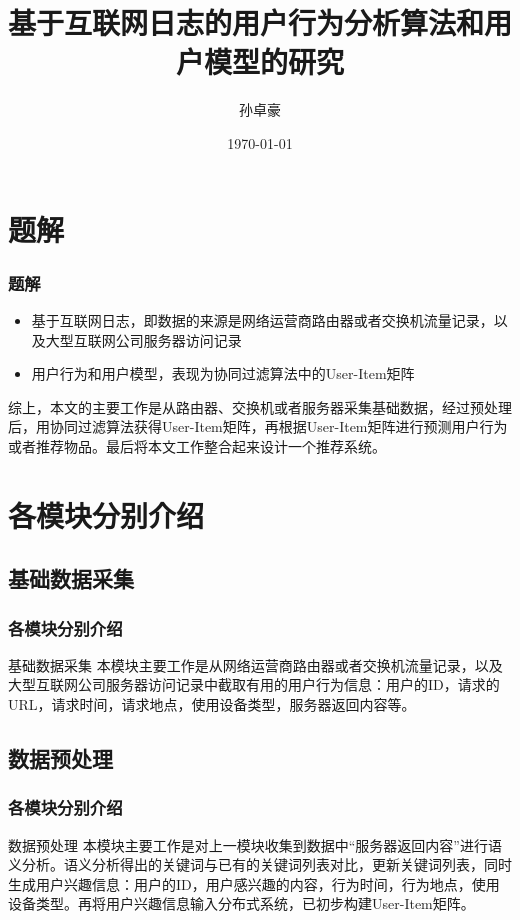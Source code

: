 \documentclass{beamer}
\title{基于互联网日志的用户行为分析算法和用户模型的研究}
\author{孙卓豪}
\institute{南开大学 \& 电子信息科学与技术}
\date{\today}
\begin{document}
\begin{frame}
	\titlepage
\end{frame}

\begin{frame}
	\tableofcontents
\end{frame}

\section{题解}
\begin{frame}
	\frametitle{题解}
	\begin{itemize}
		\item 基于互联网日志，即数据的来源是网络运营商路由器或者交换机流量记录，以及大型互联网公司服务器访问记录
		\item 用户行为和用户模型，表现为协同过滤算法中的User-Item矩阵
	\end{itemize}
	综上，本文的主要工作是从路由器、交换机或者服务器采集基础数据，经过预处理后，用协同过滤算法获得User-Item矩阵，再根据User-Item矩阵进行预测用户行为或者推荐物品。最后将本文工作整合起来设计一个推荐系统。
\end{frame}

\section{各模块分别介绍}
\subsection{基础数据采集}
\begin{frame}
	\frametitle{各模块分别介绍}
		\begin{block}{基础数据采集}
		本模块主要工作是从网络运营商路由器或者交换机流量记录，以及大型互联网公司服务器访问记录中截取有用的用户行为信息：用户的ID，请求的URL，请求时间，请求地点，使用设备类型，服务器返回内容等。
		\end{block}
\end{frame}

\subsection{数据预处理}
\begin{frame}
	\frametitle{各模块分别介绍}
		\begin{block}{数据预处理}
		本模块主要工作是对上一模块收集到数据中“服务器返回内容”进行语义分析。语义分析得出的关键词与已有的关键词列表对比，更新关键词列表，同时生成用户兴趣信息：用户的ID，用户感兴趣的内容，行为时间，行为地点，使用设备类型。再将用户兴趣信息输入分布式系统，已初步构建User-Item矩阵。
		\end{block}
\end{frame}
\end{document}
